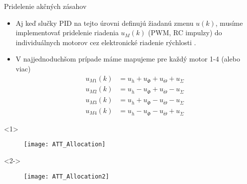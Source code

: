   \begin{frame}{Pridelenie akčných zásahov}
  \begin{itemize}
    \item<1-> Aj keď slučky PID na tejto úrovni definujú žiadanú zmenu $u(k)$, musíme implementovať pridelenie riadenia  $u_M(k)$ (PWM, RC impulzy) do individuálnych motorov cez elektronické riadenie rýchlosti .
     \item<2-> V najjednoduchšom prípade máme mapujeme pre každý motor 1-4 (alebo viac)
      {\scriptsize
    \begin{align}
     u_{M1}(k) &= u_{\dot{h}}  + u_{\dot{\Phi}} + u_{\dot{\Theta}}  + u_{\dot{\Sigma}}\\
     u_{M2}(k) &= u_{\dot{h}}  - u_{\dot{\Phi}} + u_{\dot{\Theta}}  - u_{\dot{\Sigma}}\\
     u_{M3}(k) &= u_{\dot{h}}  + u_{\dot{\Phi}} - u_{\dot{\Theta}}  - u_{\dot{\Sigma}}\\
     u_{M4}(k) &= u_{\dot{h}}  - u_{\dot{\Phi}} - u_{\dot{\Theta}}  + u_{\dot{\Sigma}}
     \end{align}
     }
\end{itemize}
    \begin{onlyenv}<1>
  \begin{figure}
\centering
  \texttt{[image: ATT\_Allocation]}\\
\end{figure}
\end{onlyenv}
    \begin{onlyenv}<2->
  \begin{figure}
\centering
  \texttt{[image: ATT\_Allocation2]}\\
\end{figure}
\end{onlyenv}
  \end{frame}

